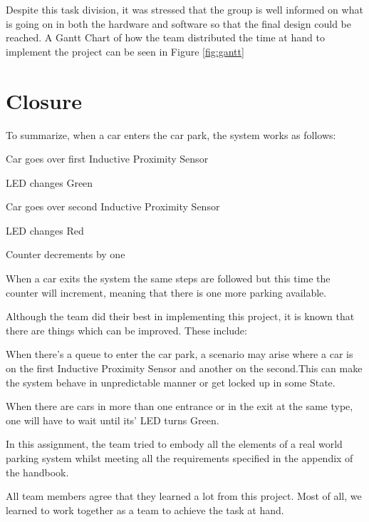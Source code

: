 \documentclass[11pt,a4paper,twocolumn]{article}
\begin{document}
Despite this task division, it was stressed that the group is well informed on what is going on in both the hardware and software so that the final design could be reached.
A Gantt Chart of how the team distributed the time at hand to implement the project can be seen in Figure \ref{fig:gantt}


\section{Closure} 

To summarize, when a car enters the car park, the system works as follows:
\begin{itemize}{
\item Car goes over first Inductive Proximity Sensor
\item LED changes Green
\item Car goes over second Inductive Proximity Sensor
\item LED changes Red
\item Counter decrements by one
}
\end{itemize}

When a car exits the system the same steps are followed but this time the counter will increment, meaning that there is one more parking available.

Although the team did their best in implementing this project, it is known that there are things which can be improved. These include:
\begin{itemize}{
\item When there’s a queue to enter the car park, a scenario may arise where a car is on the first Inductive Proximity Sensor and another on the second.This can make the system behave in unpredictable manner or get locked up in some State. 
\item When there are cars in more than one entrance or in the exit at the same type, one will have to wait until its' LED turns Green. 
}
\end{itemize}
In this assignment, the team tried to embody all the elements of a real world parking system whilst meeting all the requirements specified in the appendix of the handbook. 

All team members agree that they learned a lot from this project. Most of all, we learned to work together as a team to achieve the task at hand. 
 

\end{document}
